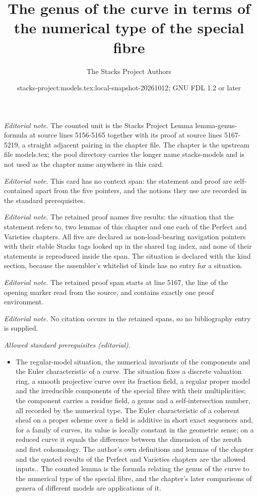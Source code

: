 \documentclass[10pt,a4paper]{amsart}
\title{The genus of the curve in terms of the numerical type of the special fibre}
\author{The Stacks Project Authors}
\date{stacks-project:models.tex:local-snapshot-20261012; GNU FDL 1.2 or later}
\theoremstyle{plain}
\theoremstyle{definition}
\theoremstyle{remark}
\numberwithin{equation}{subsection}
\begin{document}
\maketitle
\noindent\textit{Editorial note.} The counted unit is the Stacks Project Lemma lemma-genus-formula at source lines 5156-5165 together with its proof at source lines 5167-5219, a straight adjacent pairing in the chapter file. The chapter is the upstream file models.tex; the pool directory carries the longer name stacks-models and is not used as the chapter name anywhere in this card.\par\medskip
\noindent\textit{Editorial note.} This card has no context span: the statement and proof are self-contained apart from the five pointers, and the notions they use are recorded in the standard prerequisites.\par\medskip
\noindent\textit{Editorial note.} The retained proof names five results: the situation that the statement refers to, two lemmas of this chapter and one each of the Perfect and Varieties chapters. All five are declared as non-load-bearing navigation pointers with their stable Stacks tags looked up in the shared tag index, and none of their statements is reproduced inside the span. The situation is declared with the kind section, because the assembler's whitelist of kinds has no entry for a situation.\par\medskip
\noindent\textit{Editorial note.} The retained proof span starts at line 5167, the line of the opening marker read from the source, and contains exactly one proof environment.\par\medskip
\noindent\textit{Editorial note.} No citation occurs in the retained spans, so no bibliography entry is supplied.\par\medskip
\noindent\textit{Allowed standard prerequisites (editorial).}\begin{itemize}
\item The regular-model situation, the numerical invariants of the components and the Euler characteristic of a curve. The situation fixes a discrete valuation ring, a smooth projective curve over its fraction field, a regular proper model and the irreducible components of the special fibre with their multiplicities; the component carries a residue field, a genus and a self-intersection number, all recorded by the numerical type. The Euler characteristic of a coherent sheaf on a proper scheme over a field is additive in short exact sequences and, for a family of curves, its value is locally constant in the geometric sense; on a reduced curve it equals the difference between the dimension of the zeroth and first cohomology. The author's own definitions and lemmas of the chapter and the quoted results of the Perfect and Varieties chapters are the allowed inputs.. The counted lemma is the formula relating the genus of the curve to the numerical type of the special fibre, and the chapter's later comparisons of genera of different models are applications of it.
\end{itemize}\medskip
\end{document}
